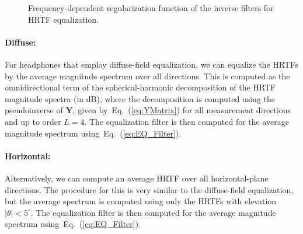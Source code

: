 \documentclass[11pt, oneside]{article}
\newcommand{\eqnref}[1]{Eq.~(\ref{#1})}
\begin{document}
\begin{figure}
\centering
{}
\caption{Frequency-dependent regularization function of the inverse filters for HRTF equalization.}\label{fig:beta}
\end{figure}

\paragraph{Diffuse:} For headphones that employ diffuse-field equalization,
we can equalize the HRTFs by the average magnitude spectrum over all directions.
This is computed as the omnidirectional term of the spherical-harmonic decomposition of the HRTF magnitude spectra (in dB),
where the decomposition is computed using the pseudoinverse of $\mathbf{Y}$, given by~\eqnref{eq:YMatrix} for all measurement directions and up to order $L = 4$.
The equalization filter is then computed for the average magnitude spectrum using~\eqnref{eq:EQ_Filter}.

\paragraph{Horizontal:} Alternatively, we can compute an average HRTF over all horizontal-plane directions.
The procedure for this is very similar to the diffuse-field equalization, but the average spectrum is computed using only the HRTFs with elevation $|\theta| < 5^\circ$.
The equalization filter is then computed for the average magnitude spectrum using~\eqnref{eq:EQ_Filter}.
\end{document}
